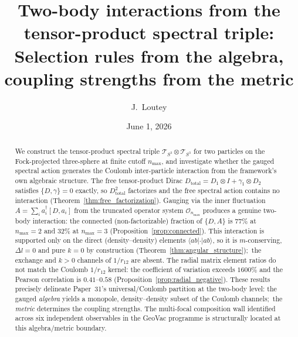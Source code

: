 \documentclass[twocolumn,pra,amsmath,amssymb,superscriptaddress]{revtex4-2}
\begin{document}
\title{Two-body interactions from the tensor-product spectral triple:\\
{\large Selection rules from the algebra, coupling strengths from the metric}}

\author{J.~Loutey}

\date{June 1, 2026}

\begin{abstract}
We construct the tensor-product spectral triple
$\mathcal{T}_{S^3} \otimes \mathcal{T}_{S^3}$ for two particles on the
Fock-projected three-sphere at finite cutoff $n_{\max}$, and investigate
whether the gauged spectral action generates the Coulomb inter-particle
interaction from the framework's own algebraic structure. The free
tensor-product Dirac $D_{\mathrm{total}} = D_1 \otimes I + \gamma_1
\otimes D_2$ satisfies $\{D, \gamma\} = 0$ exactly, so
$D_{\mathrm{total}}^2$ factorizes and the free spectral action contains
no interaction (Theorem~\ref{thm:free_factorization}). Gauging via the
inner fluctuation $A = \sum_i a_i^\dagger [D, a_i]$ from the truncated
operator system $\mathcal{O}_{n_{\max}}$ produces a genuine two-body
interaction: the connected (non-factorizable) fraction of $\{D, A\}$ is
$77\%$ at $n_{\max} = 2$ and $32\%$ at $n_{\max} = 3$
(Proposition~\ref{prop:connected}). This interaction is supported
only on the direct (density--density) elements $\langle ab|\cdot|ab
\rangle$, so it is $m$-conserving, $\Delta l = 0$ and pure $k = 0$ by
construction (Theorem~\ref{thm:angular_structure});\ the exchange and
$k > 0$ channels of $1/r_{12}$ are absent. The radial matrix
element ratios do not match the Coulomb $1/r_{12}$ kernel: the
coefficient of variation exceeds $1600\%$ and the Pearson correlation
is $0.41$--$0.58$ (Proposition~\ref{prop:radial_negative}). These
results precisely delineate Paper~31's universal/Coulomb partition at
the two-body level: the gauged \emph{algebra} yields a monopole,
density--density subset of the Coulomb channels;\ the \emph{metric}
determines the coupling strengths. The multi-focal composition wall
identified across six independent observables in the GeoVac programme
is structurally located at this algebra/metric boundary.
\end{abstract}

\maketitle

\end{document}
